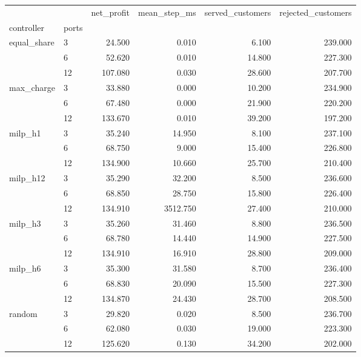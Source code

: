 \begin{tabular}{llrrrr}
\toprule
 &  & net_profit & mean_step_ms & served_customers & rejected_customers \\
controller & ports &  &  &  &  \\
\midrule
\multirow[t]{3}{*}{equal_share} & 3 & 24.500 & 0.010 & 6.100 & 239.000 \\
 & 6 & 52.620 & 0.010 & 14.800 & 227.300 \\
 & 12 & 107.080 & 0.030 & 28.600 & 207.700 \\
\cline{1-6}
\multirow[t]{3}{*}{max_charge} & 3 & 33.880 & 0.000 & 10.200 & 234.900 \\
 & 6 & 67.480 & 0.000 & 21.900 & 220.200 \\
 & 12 & 133.670 & 0.010 & 39.200 & 197.200 \\
\cline{1-6}
\multirow[t]{3}{*}{milp_h1} & 3 & 35.240 & 14.950 & 8.100 & 237.100 \\
 & 6 & 68.750 & 9.000 & 15.400 & 226.800 \\
 & 12 & 134.900 & 10.660 & 25.700 & 210.400 \\
\cline{1-6}
\multirow[t]{3}{*}{milp_h12} & 3 & 35.290 & 32.200 & 8.500 & 236.600 \\
 & 6 & 68.850 & 28.750 & 15.800 & 226.400 \\
 & 12 & 134.910 & 3512.750 & 27.400 & 210.000 \\
\cline{1-6}
\multirow[t]{3}{*}{milp_h3} & 3 & 35.260 & 31.460 & 8.800 & 236.500 \\
 & 6 & 68.780 & 14.440 & 14.900 & 227.500 \\
 & 12 & 134.910 & 16.910 & 28.800 & 209.000 \\
\cline{1-6}
\multirow[t]{3}{*}{milp_h6} & 3 & 35.300 & 31.580 & 8.700 & 236.400 \\
 & 6 & 68.830 & 20.090 & 15.500 & 227.300 \\
 & 12 & 134.870 & 24.430 & 28.700 & 208.500 \\
\cline{1-6}
\multirow[t]{3}{*}{random} & 3 & 29.820 & 0.020 & 8.500 & 236.700 \\
 & 6 & 62.080 & 0.030 & 19.000 & 223.300 \\
 & 12 & 125.620 & 0.130 & 34.200 & 202.000 \\
\cline{1-6}
\bottomrule
\end{tabular}
